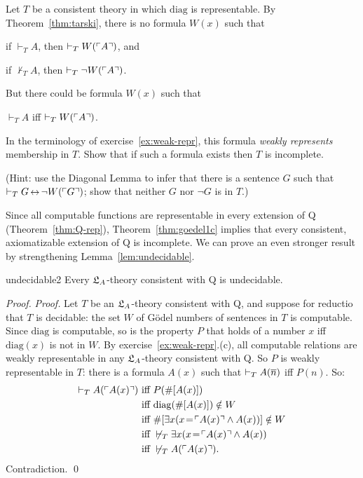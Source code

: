 \begin{exercise}
    Let $T$ be a consistent theory in which $\mathrm{diag}$ is representable.
    By Theorem~\ref{thm:tarski},
    there is no formula $W(x)$ such that
    \begin{cenumerate}
    \item[(i)] if $\vdash_T A$, then $\vdash_T W(\ulcorner A \urcorner)$, and
    \item[(ii)] if $\not\vdash_T A$, then $\vdash_T \neg W(\ulcorner A \urcorner)$.
    \end{cenumerate}
    But there could be formula $W(x)$ such that
    \begin{cenumerate}
    \item[(i*)] $\vdash_T A$ iff $\vdash_T W(\ulcorner A \urcorner)$.
    \end{cenumerate}
    In the terminology of exercise~\ref{ex:weak-repr},
    this formula \emph{weakly represents} membership in $T$.
    Show that if such a formula exists
    then $T$ is incomplete.

    (Hint:
    use the Diagonal Lemma to infer that there is a sentence $G$ such that
    $\proves_T G \leftrightarrow \neg W(\gn{G})$;
    show that neither $G$ nor $\neg G$ is in $T$.)
\end{exercise}

Since all computable functions are representable in every extension of Q
(Theorem~\ref{thm:Q-rep}),
Theorem~\ref{thm:goedel1c} implies that
every consistent, axiomatizable extension of Q is incomplete.
We can prove an even stronger result
by strengthening Lemma~\ref{lem:undecidable}.

\begin{lemma}{}{undecidable2}
  Every $\mathfrak{L}_A$-theory consistent with Q is undecidable.
\end{lemma}
\begin{proof}
  \emph{Proof.}
  Let $T$ be an $\mathfrak{L}_A$-theory consistent with Q,
  and suppose for reductio that $T$ is decidable:
  the set $W$ of Gödel numbers of sentences in $T$ is computable.
  Since $\mathrm{diag}$ is computable,
  so is the property $P$ that holds of a number $x$ iff
  $\mathrm{diag}(x)$ is not in $W$.
  By exercise~\ref{ex:weak-repr}.(c),
  all computable relations are weakly representable in any $\mathfrak{L}_A$-theory
  consistent with Q.
  So $P$ is weakly representable in $T$:
  there is a formula $A(x)$ such that
  $\vdash_T A(\overline{n})$ iff $P(n)$.
  So:
  \begin{align*}  
    \vdash_T A(\ulcorner A(x) \urcorner) &\text{ iff } P(\#[A(x)]) \\
                           &\text{ iff } \mathrm{diag}(\#[A(x)]) \notin W \\
                           &\text{ iff } \#[\exists x(x\!=\!\ulcorner A(x) \urcorner \land A(x))] \notin W \\
                           &\text{ iff } \not\vdash_T \exists x(x\!=\!\ulcorner A(x) \urcorner \land A(x))\\
                           &\text{ iff } \not\vdash_T A(\ulcorner A(x) \urcorner).
  \end{align*}
  Contradiction. \qed
\end{proof}

